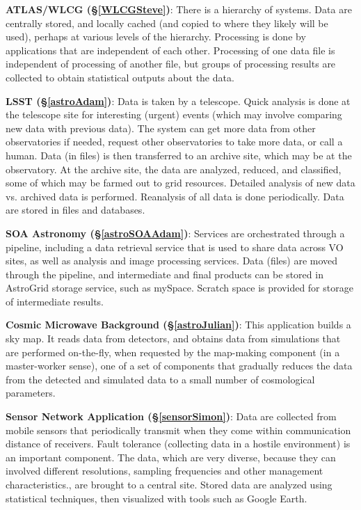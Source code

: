 \documentclass[times]{cpeauth}
\begin{document}
{\bf ATLAS/WLCG (\S\ref{WLCGSteve})}: There is a hierarchy of systems. Data are
centrally stored, and locally cached (and copied to where they likely will be
used), perhaps at various levels of the hierarchy. Processing is done by
applications that are independent of each other. Processing of one data file is
independent of processing of another file, but groups of processing results are
collected to obtain statistical outputs about the data.

{\bf LSST (\S\ref{astroAdam})}: Data is taken by a telescope. Quick analysis is
done at the telescope site for interesting (urgent) events (which may involve
comparing new data with previous data).  The system can get more data from other
observatories if needed, request other observatories to take more data, or call
a human. Data (in files) is then transferred to an archive site, which may be at
the observatory. At the archive site, the data are analyzed, reduced, and
classified, some of which may be farmed out to grid resources.  Detailed
analysis of new data vs. archived data is performed.  Reanalysis of all data is
done periodically.  Data are stored in files and databases.

{\bf SOA Astronomy (\S\ref{astroSOAAdam})}: Services are orchestrated through a
pipeline, including a data retrieval service that is used to share data across
VO sites, as well as analysis and image processing services.  Data (files) are
moved through the pipeline, and intermediate and final products can be stored in
AstroGrid storage service, such as mySpace.  Scratch space is provided for
storage of intermediate results.

{\bf Cosmic Microwave Background (\S\ref{astroJulian})}: This application builds
a sky map.  It reads data from detectors, and obtains data from simulations that
are performed on-the-fly, when requested by the map-making component (in a
master-worker sense), one of a set of components that gradually reduces the data
from the detected and simulated data to a small number of cosmological
parameters.

{\bf Sensor Network Application (\S\ref{sensorSimon})}: Data are collected from
mobile sensors that periodically transmit when they come within communication
distance of receivers. Fault tolerance (collecting data in a hostile
environment) is an important component. The data, which are very diverse,
because they can involved different resolutions, sampling frequencies and other
management characteristics., are brought to a central site. Stored data are
analyzed using statistical techniques, then visualized with tools such as Google
Earth.
\end{document}
